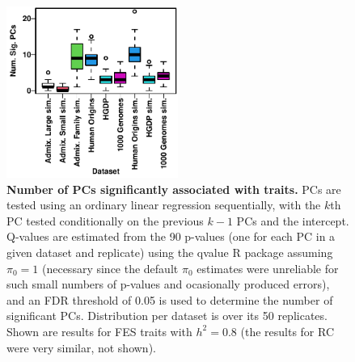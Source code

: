 \documentclass[11pt]{article}
\begin{document}
\begin{figure}[hp!]
  \centering
  \includegraphics[width=0.5\textwidth]{fes/pcs-num-sig.pdf}
  \caption{
    {\bf Number of PCs significantly associated with traits.}
    PCs are tested using an ordinary linear regression sequentially, with the $k$th PC tested conditionally on the previous $k-1$ PCs and the intercept.
    Q-values are estimated from the 90 p-values (one for each PC in a given dataset and replicate) using the qvalue R package assuming $\pi_0 = 1$ (necessary since the default $\pi_0$ estimates were unreliable for such small numbers of p-values and ocasionally produced errors), and an FDR threshold of 0.05 is used to determine the number of significant PCs.
    Distribution per dataset is over its 50 replicates.
    Shown are results for FES traits with $h^2=0.8$ (the results for RC were very similar, not shown).
  }
  \label{fig:pcs-num-sig}
\end{figure}
\end{document}
